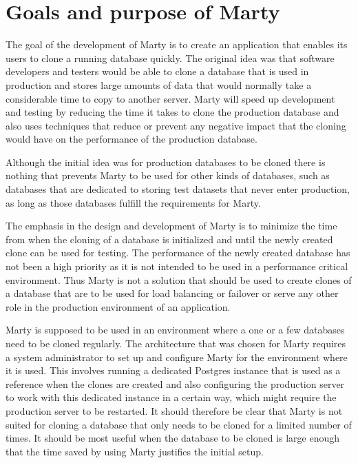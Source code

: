 \section{Goals and purpose of Marty}
The goal of the development of Marty is to create an application that enables its users to clone a running database quickly.
The original idea was that software developers and testers would be able to clone a database that is used in production and stores large amounts of data that would normally take a considerable time to copy to another server.
Marty will speed up development and testing by reducing the time it takes to clone the production database and also uses techniques that reduce or prevent any negative impact that the cloning would have on the performance of the production database. 

Although the initial idea was for production databases to be cloned there is nothing that prevents Marty to be used for other kinds of databases, such as databases that are dedicated to storing test datasets that never enter production, as long as those databases fulfill the requirements for Marty.

The emphasis in the design and development of Marty is to minimize the time from when the cloning of a database is initialized and until the newly created clone can be used for testing.
The performance of the newly created database has not been a high priority as it is not intended to be used in a performance critical environment.
Thus Marty is not a solution that should be used to create clones of a database that are to be used for load balancing or failover or serve any other role in the production environment of an application.

Marty is supposed to be used in an environment where a one or a few databases need to be cloned regularly.
The architecture that was chosen for Marty requires a system administrator to set up and configure Marty for the environment where it is used.
This involves running a dedicated Postgres instance that is used as a reference when the clones are created and also configuring the production server to work with this dedicated instance in a certain way, which might require the production server to be restarted.
It should therefore be clear that Marty is not suited for cloning a database that only needs to be cloned for a limited number of times.
It should be most useful when the database to be cloned is large enough that the time saved by using Marty justifies the initial setup.